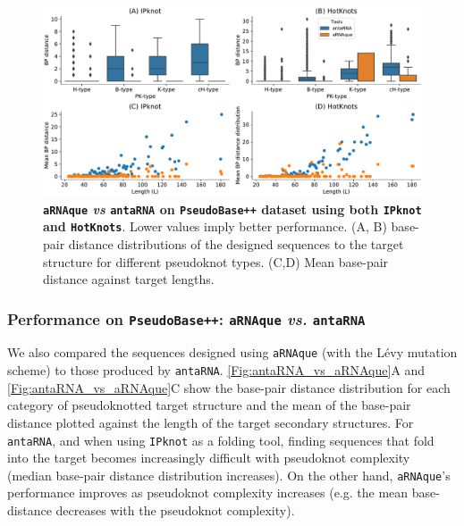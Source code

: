 \begin{figure}[t!]
	\includegraphics[width=1.0\linewidth]{../res/images/arnaque/fig5.pdf}
	\caption{\textbf{\texttt{aRNAque} \emph{vs} \texttt{antaRNA} on \texttt{PseudoBase++} dataset using both  \texttt{IPknot} and \texttt{HotKnots}}. Lower values imply better performance. (A, B) base-pair distance distributions of the designed sequences to the target structure for different pseudoknot types. (C,D) Mean base-pair distance against target lengths. }\label{Fig:antaRNA_vs_aRNAque}
\end{figure}
\subsubsection{Performance on \texttt{PseudoBase++}: \texttt{aRNAque} \emph{vs.} \texttt{antaRNA}}
We also compared the sequences designed using \texttt{aRNAque} (with the Lévy mutation scheme) to those produced by \texttt{antaRNA}. \autoref{Fig:antaRNA_vs_aRNAque}A and \autoref{Fig:antaRNA_vs_aRNAque}C show the base-pair distance distribution for each category of pseudoknotted target structure and the mean of the base-pair distance plotted against the length of the target secondary structures. For \texttt{antaRNA}, and when using \texttt{IPknot} as a folding tool, finding sequences that fold into the target becomes increasingly difficult with pseudoknot complexity (median base-pair distance distribution increases). On the other hand, \texttt{aRNAque}’s performance improves as pseudoknot complexity increases (e.g. the mean base-distance decreases with the pseudoknot complexity). 

